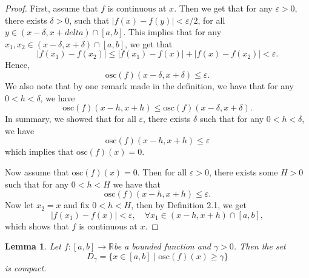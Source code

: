 \documentclass[12pt]{article}
\newtheorem{lemma}[theorem]{Lemma}
\theoremstyle{definition}
\theoremstyle{definition}
\newcommand{\abs}[1]{\lvert #1 \rvert}
\begin{document}
        \begin{proof}
            First, assume that $f$ is continuous at $x$. Then we get that for
            any $\varepsilon>0$, there exists $\delta>0$, such that
            $\abs{f(x)-f(y)}<\varepsilon/2$, for all $y\in(x-\delta,
            x+delta)\cap[a, b]$. This implies that for any $x_1,
            x_2\in(x-\delta, x+\delta)\cap[a, b]$, we get that 
                \begin{equation*}
                    \abs{f(x_1)-f(x_2)}\leq\abs{f(x_1)-f(x)}+\abs{f(x)-f(x_2)}<\varepsilon.
                \end{equation*}
            Hence, 
                \begin{equation*}
                    \text{osc}(f)(x-\delta, x+\delta)\leq\varepsilon.
                \end{equation*}
            We also note that by one remark made in the definition, we have
            that for any $0<h<\delta$, we have
                \begin{equation*}
                    \text{osc}(f)(x-h, x+h)\leq\text{osc}(f)(x-\delta,
                    x+\delta).
                \end{equation*}
            In summary, we showed that for all $\varepsilon$, there exists
            $\delta$ such that for any $0<h<\delta$, we have
                \begin{equation*}
                    \text{osc}(f)(x-h, x+h)\leq\varepsilon
                \end{equation*}
            which implies that $\text{osc}(f)(x)=0$.\par Now assume
            that $\text{osc}(f)(x)=0$. Then for all $\varepsilon>0$, there
            exists some $H>0$ such that for any $0<h<H$ we have that 
                \begin{equation*}
                    \text{osc}(f)(x-h, x+h)\leq\varepsilon.
                \end{equation*}
            Now let $x_2=x$ and fix $0<h<H$, then by Definition 2.1, we get 
                \begin{equation*}
                    \abs{f(x_1)-f(x)}<\varepsilon, \quad\forall x_1\in(x-h,
                    x+h)\cap[a, b], 
                \end{equation*}
            which shows that $f$ is continuous at $x$.
        \end{proof}
    \begin{lemma}
        Let $f:[a, b]\to\mathbb{R}$be a bounded function and $\gamma>0$.
        Then the set 
            \begin{equation*}
                D_{\gamma}=\Big\{x\in[a,
                b]\mid\text{osc}(f)(x)\geq\gamma\Big\}
            \end{equation*}
        is compact.
    \end{lemma}
\end{document}
